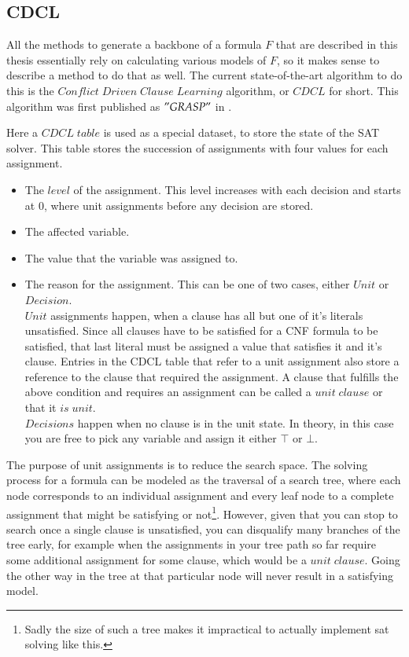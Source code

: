 \subsection{CDCL}
\label{ss:cdcl}
All the methods to generate a backbone of a formula $F$ that are described in this thesis essentially rely on calculating various models of $F$, so it makes sense to describe a method to do that as well. The current state-of-the-art algorithm to do this is the $Conflict\;Driven\;Clause\;Learning$ algorithm, or $CDCL$ for short. This algorithm was first published as $"GRASP"$ in \cite{GRASP}.

Here a $CDCL\;table$ is used as a special dataset, to store the state of the SAT solver. This table stores the succession of assignments with four values for each assignment.
\begin{itemize}
\item The $level$ of the assignment. This level increases with each decision and starts at 0, where unit assignments before any decision are stored.
\item The affected variable.
\item The value that the variable was assigned to.
\item The reason for the assignment. This can be one of two cases, either $Unit$ or $Decision$. 
\\
$Unit$ assignments happen, when a clause has all but one of it's literals unsatisfied. Since all clauses have to be satisfied for a CNF formula to be satisfied, that last literal must be assigned a value that satisfies it and it's clause. Entries in the CDCL table that refer to a unit assignment also store a reference to the clause that required the assignment. A clause that fulfills the above condition and requires an assignment can be called a $unit\; clause$ or that it $is\; unit$.
\\
$Decisions$ happen when no clause is in the unit state. In theory, in this case you are free to pick any variable and assign it either $\top$ or $\bot$. 
\end{itemize}

The purpose of unit assignments is to reduce the search space. The solving process for a formula can be modeled as the traversal of a search tree, where each node corresponds to an individual assignment and every leaf node to a complete assignment that might be satisfying or not\footnote
{
	Sadly the size of such a tree makes it impractical to actually implement sat solving like this.
}. However, given that you can stop to search once a single clause is unsatisfied, you can disqualify many branches of the tree early, for example when the assignments in your tree path so far require some additional assignment for some clause, which would be a $unit\; clause$. Going the other way in the tree at that particular node will never result in a satisfying model.

